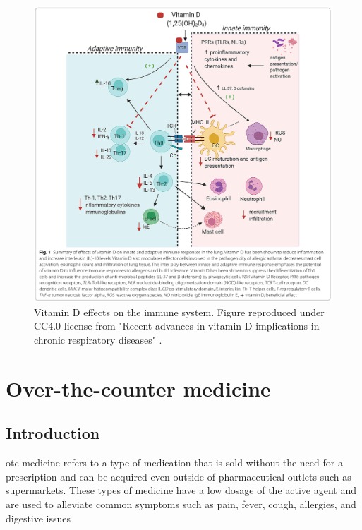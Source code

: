 \begin{figure}[ht!]
{
    \centering
    \includegraphics[width=1\textwidth]{figures/Vitamin D/VDRImmunity.png}
    \caption{Vitamin D effects on the immune system. Figure reproduced under CC4.0 license from "Recent advances in vitamin D implications in chronic respiratory diseases" \cite{Gaudet2022}.} 
    \label{fig:vitVDRimmune}
}
\medskip
\end{figure}


\section{Over-the-counter medicine}

\subsection{Introduction}

\gls{otc} medicine \cite{Algarni2021} refers to a type of medication that is sold without the need for a prescription and can be acquired even outside of pharmaceutical outlets such as supermarkets. These types of medicine have a low dosage of the active agent and are used to alleviate common symptoms such as pain, fever, cough, allergies, and digestive issues

